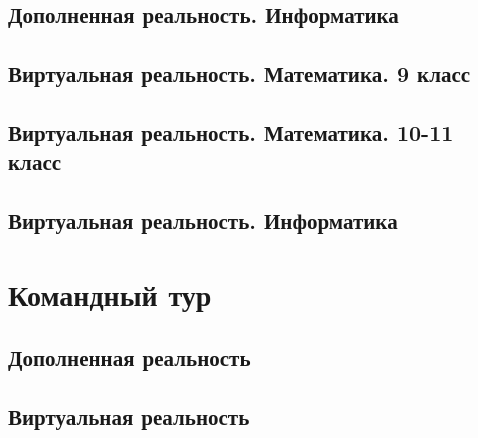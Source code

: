 \documentclass[a4paper,12pt,oneside]{book}
\begin{document}
\section{Дополненная реальность. Информатика}


\section{Виртуальная реальность. Математика. 9 класс}


\section{Виртуальная реальность. Математика. 10-11 класс}


\section{Виртуальная реальность. Информатика}



\chapter{Командный тур}

\section{Дополненная реальность} 


\section{Виртуальная реальность}




\clearpage
\text{ }
\end{document}
